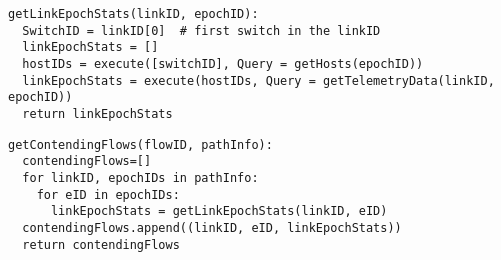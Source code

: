 \begin{center}
\begin{lstlisting}[xleftmargin=.2\textwidth]
getLinkEpochStats(linkID, epochID):
  SwitchID = linkID[0]  # first switch in the linkID
  linkEpochStats = []
  hostIDs = execute([switchID], Query = getHosts(epochID))
  linkEpochStats = execute(hostIDs, Query = getTelemetryData(linkID, epochID))
  return linkEpochStats
\end{lstlisting}
\end{center}

\begin{center}
\begin{lstlisting}[xleftmargin=.2\textwidth]
getContendingFlows(flowID, pathInfo):
  contendingFlows=[]
  for linkID, epochIDs in pathInfo:
    for eID in epochIDs:
      linkEpochStats = getLinkEpochStats(linkID, eID)
  contendingFlows.append((linkID, eID, linkEpochStats))
  return contendingFlows
\end{lstlisting}
\end{center}
